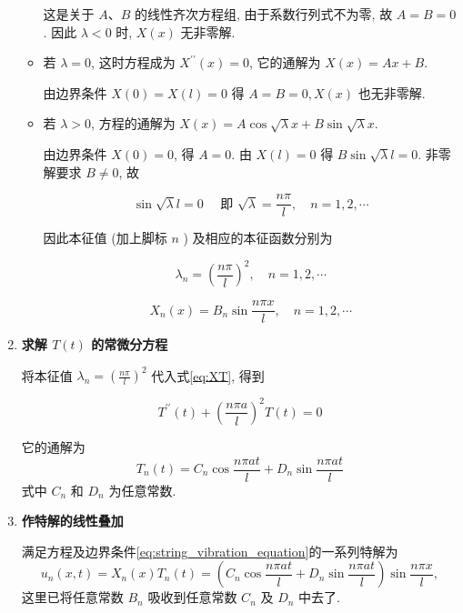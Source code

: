 \begin{enumerate}
\begin{itemize}
        这是关于 $A 、 B$ 的线性齐次方程组, 由于系数行列式不为零, 故 $A=B=0$. 因此 $\lambda<0$ 时, $X(x)$ 无非零解.

    \item 若 $\lambda=0$, 这时方程成为 $X^{\prime \prime}(x)=0$, 它的通解为 $X(x)=A x+B$.

        由边界条件 $X(0)=X(l)=0$ 得 $A=B=0, X(x)$ 也无非零解.
    
    \item 若 $\lambda>0$, 方程的通解为 $X(x)=A \cos \sqrt{\lambda} x+B \sin \sqrt{\lambda} x$.

        由边界条件 $X(0)=0$, 得 $A=0$. 由 $X(l)=0$ 得 $B \sin \sqrt{\lambda} l=0$. 非零解要求 $B \neq 0$, 故
        
        $$
        \sin \sqrt{\lambda} l=0 \quad \text { 即 } \sqrt{\lambda}=\frac{n \pi}{l}, \quad n=1,2, \cdots
        $$
        
        因此本征值 (加上脚标 $n$ ) 及相应的本征函数分别为
        
        $$
        \lambda_{n}=\left(\frac{n \pi}{l}\right)^{2}, \quad n=1,2, \cdots
        $$
        
        $$
        X_{n}(x)=B_{n} \sin \frac{n \pi x}{l}, \quad n=1,2, \cdots
        $$
\end{itemize}





  \item \textbf{求解 $T(t)$ 的常微分方程}
  
    将本征值 $\lambda_{n}=\left(\frac{n \pi}{l}\right)^{2}$ 代入式\eqref{eq:XT}, 得到

    $$
    T^{\prime \prime}(t)+\left(\frac{n \pi a}{l}\right)^{2} T(t)=0
    $$

    它的通解为
    $$
    T_{n}(t)=C_{n} \cos \frac{n \pi a t}{l}+D_{n} \sin \frac{n \pi a t}{l}
    $$
    式中 $C_{n}$ 和 $D_{n}$ 为任意常数.
    
    \item \textbf{作特解的线性叠加}
    
    满足方程及边界条件\eqref{eq:string_vibration_equation}的一系列特解为
    \begin{equation}
        u_{n}(x, t)=X_{n}(x) T_{n}(t)=\left(C_{n} \cos \frac{n \pi a t}{l}+D_{n} \sin \frac{n \pi a t}{l}\right) \sin \frac{n \pi x}{l}, 
        \label{eq:special_solution}
    \end{equation}
    这里已将任意常数 $B_{n}$ 吸收到任意常数 $C_{n}$ 及 $D_{n}$ 中去了.
    

\end{enumerate}
